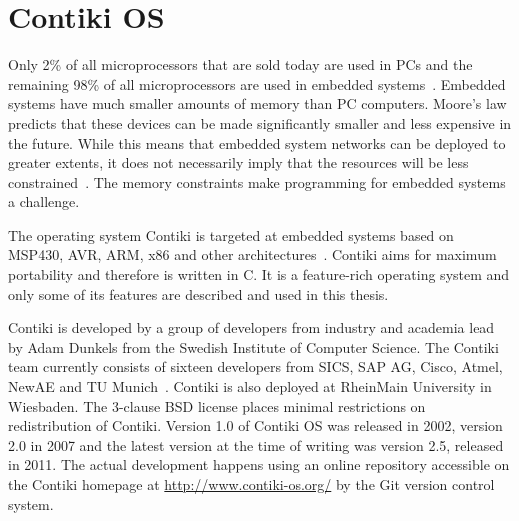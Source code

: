 
\chapter{Contiki OS}
Only 2\% of all microprocessors that are sold today are used in PCs and the remaining 98\%
of all microprocessors are used in embedded systems~\cite{thesis-programming}.
Embedded systems have much smaller amounts of memory than PC computers.
Moore's law predicts that these devices
can be made significantly smaller and less expensive in the future.
While this means that embedded system networks can
be deployed to greater extents, it does not necessarily imply
that the resources will be less constrained~\cite{paper-contiki}.
The memory constraints make programming for embedded systems a challenge.

The operating system Contiki is targeted at embedded systems based on MSP430, AVR, ARM, x86
and other architectures~\cite{contiki-docs}.
Contiki aims for maximum portability and therefore is written in C.
It is a feature-rich operating system and
only some of its features are described and used in this thesis.

Contiki is developed by a group of developers from industry and academia
lead by Adam Dunkels from the Swedish Institute of Computer Science.
The Contiki team currently consists of sixteen developers from SICS,
SAP AG, Cisco, Atmel, NewAE and TU Munich~\cite{contiki-docs}.
Contiki is also deployed at RheinMain University in Wiesbaden.
The 3-clause BSD license places minimal restrictions on redistribution of Contiki.
Version 1.0 of Contiki OS was released in 2002, version 2.0 in 2007 and the latest version
at the time of writing was version 2.5, released in 2011.
The actual development happens using an online repository accessible
on the Contiki homepage at \url{http://www.contiki-os.org/}
by the Git version control system.










